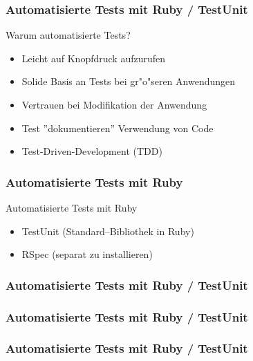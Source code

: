 \documentclass{beamer}
\begin{document}
\lstset{language=Ruby}
\lstset{basicstyle=\small,numbers=none, numberstyle=\tiny, numbersep=5pt}
\begin{frame}
  \frametitle{Automatisierte Tests mit Ruby / TestUnit}
  Warum automatisierte Tests?
  \begin{itemize}
    \item Leicht auf Knopfdruck aufzurufen
    \item Solide Basis an Tests bei gr"o"seren Anwendungen
    \item Vertrauen bei Modifikation der Anwendung
    \item Test ''dokumentieren'' Verwendung von Code
    \item Test-Driven-Development (TDD)
  \end{itemize}
\end{frame}

\begin{frame}
  \frametitle{Automatisierte Tests mit Ruby}
  Automatisierte Tests mit Ruby
  \begin{itemize}
    \item<1-> TestUnit (Standard--Bibliothek in Ruby)
    \item<2-> RSpec (separat zu installieren)
  \end{itemize}
\end{frame}

\begin{frame}[containsverbatim]
  \frametitle{Automatisierte Tests mit Ruby / TestUnit}

\end{frame}

\begin{frame}[containsverbatim]
  \frametitle{Automatisierte Tests mit Ruby / TestUnit}

\end{frame}

\begin{frame}[containsverbatim]
  \frametitle{Automatisierte Tests mit Ruby / TestUnit}
  
\end{frame}
\end{document}
